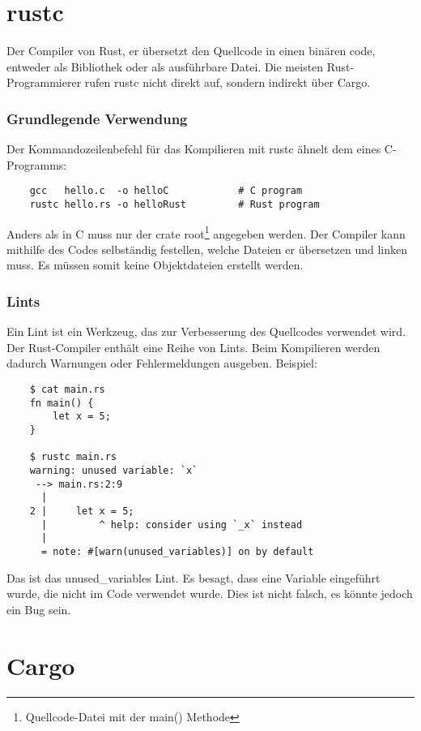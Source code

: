 \section{rustc}

Der Compiler von Rust, er übersetzt den Quellcode in einen binären code, entweder als Bibliothek oder als ausführbare Datei. Die meisten Rust-Programmierer rufen rustc nicht direkt auf, sondern indirekt über Cargo.

\subsubsection{Grundlegende Verwendung}

Der Kommandozeilenbefehl für das Kompilieren mit rustc ähnelt dem eines C-Programms:

\begin{lstlisting}
    gcc   hello.c  -o helloC            # C program
    rustc hello.rs -o helloRust         # Rust program
\end{lstlisting}

Anders als in C muss nur der crate root\footnote{Quellcode-Datei mit der main() Methode} angegeben werden. Der Compiler kann mithilfe des Codes selbständig festellen, welche Dateien er übersetzen und linken muss. Es müssen somit keine Objektdateien erstellt werden.

\subsubsection{Lints}

Ein \glqq Lint\grqq{} ist ein Werkzeug, das zur Verbesserung des Quellcodes verwendet wird. Der Rust-Compiler enthält eine Reihe von Lints. Beim Kompilieren werden dadurch Warnungen oder Fehlermeldungen ausgeben. Beispiel:

\begin{lstlisting}
    $ cat main.rs
    fn main() {
        let x = 5;
    }

    $ rustc main.rs
    warning: unused variable: `x`
     --> main.rs:2:9
      |
    2 |     let x = 5;
      |         ^ help: consider using `_x` instead
      |
      = note: #[warn(unused_variables)] on by default
\end{lstlisting}

Das ist das \glqq unused\_variables\grqq{} Lint. Es besagt, dass eine Variable eingeführt wurde, die nicht im Code verwendet wurde. Dies ist nicht falsch, es könnte jedoch ein Bug sein.


\section{Cargo}

